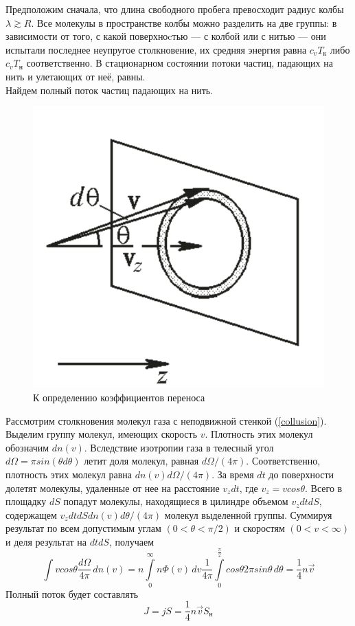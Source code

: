 \documentclass[12pt]{article}
\begin{document}
        Предположим сначала, что длина свободного пробега превосходит радиус колбы $\lambda \gtrsim R$.
        Все молекулы в пространстве колбы можно разделить на две группы: в зависимости от того, с какой поверхноcтью —
        с колбой или с нитью — они испытали последнее неупругое столкновение, их средняя энергия равна $c_vT_\text{к}$ либо $c_vT_\text{н}$
        соответственно. В стационарном состоянии потоки частиц, падающих на нить и улетающих от неё, равны.\\
        Найдем полный поток частиц падающих на нить.
        \begin{figure}[H]
            \centering
            \includegraphics[width=0.4\linewidth]{collision_with_wall.png}
            \caption{К определению коэффициентов переноса}
            \label{collision}
        \end{figure}
        Рассмотрим столкновения молекул газа с неподвижной стенкой (\ref{collusion}). Выделим группу молекул,
        имеющих скорость $v$. Плотность этих молекул обозначим $dn(v)$. Вследствие изотропии газа в телесный угол
        $d\Omega = \pi sin(\theta d\theta)$ летит доля молекул, равная $d\Omega/(4\pi)$. Соответственно,
        плотность этих молекул равна $dn(v)d\Omega/(4\pi)$. За время $dt$ до поверхности долетят молекулы, удаленные
        от нее на расстояние $v_zdt$, где $v_z = v cos\theta$. Всего в площадку $dS$ попадут молекулы, находящиеся в
        цилиндре объемом $v_zdtdS$, содержащем $v_zdtdSdn(v)d\theta/(4\pi)$ молекул выделенной группы. Суммируя результат
        по всем допустимым углам $(0 < \theta < \pi/2)$ и скоростям $(0 < v < \infty)$ и деля результат на $dtdS$, получаем
        \begin{equation}
            \int\limits vcos\theta\frac{d\Omega}{4\pi}\,dn(v) = n\int\limits_0^\infty n\Phi(v)\,dv \frac{1}{4\pi}\int\limits_0^\frac{\pi}{2} cos\theta 2\pi sin\theta\,d\theta = \frac{1}{4}n\vec{v}
        \end{equation}
        Полный поток будет составлять
        \[
            J = jS = \frac{1}{4}n\vec{v}S_{\text{н}}
        \]
\end{document}

